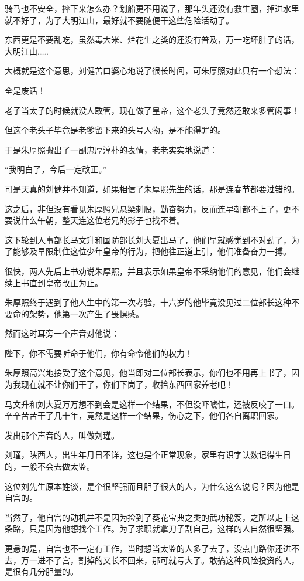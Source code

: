 \begin{multicols}{\theparacolNo}
骑马也不安全，摔下来怎么办？划船更不用说了，那年头还没有救生圈，掉进水里就不好了，为了大明江山，最好就不要随便干这些危险活动了。

东西更是不要乱吃，虽然毒大米、烂花生之类的还没有普及，万一吃坏肚子的话，大明江山……

大概就是这个意思，刘健苦口婆心地说了很长时间，可朱厚照对此只有一个想法：

全是废话！

老子当太子的时候就没人敢管，现在做了皇帝，这个老头子竟然还敢来多管闲事！

但这个老头子毕竟是老爹留下来的头号人物，是不能得罪的。

于是朱厚照搬出了一副忠厚淳朴的表情，老老实实地说道：

“我明白了，今后一定改正。”

可是天真的刘健并不知道，如果相信了朱厚照先生的话，那是连春节都要过错的。

这之后，非但没有看见朱厚照兄悬梁刺股，勤奋努力，反而连早朝都不上了，更不要说什么午朝，整天连这位老兄的影子也找不着。

这下轮到人事部长马文升和国防部长刘大夏出马了，他们早就感觉到不对劲了，为了能够及早限制住这位少年皇帝的行为，把他往正道上引，他们准备奋力一搏。

很快，两人先后上书劝说朱厚照，并且表示如果皇帝不采纳他们的意见，他们会继续上书直到皇帝改正为止。

朱厚照终于遇到了他人生中的第一次考验，十六岁的他毕竟没见过二位部长这种不要命的架势，他第一次产生了畏惧感。

然而这时耳旁一个声音对他说：

陛下，你不需要听命于他们，你有命令他们的权力！

朱厚照高兴地接受了这个意见，他当即对二位部长表示，你们也不用再上书了，因为我现在就不让你们干了，你们下岗了，收拾东西回家养老吧！

马文升和刘大夏万万想不到会是这样一个结果，不但没吓唬住，还被反咬了一口。辛辛苦苦干了几十年，竟然是这样一个结果，伤心之下，他们各自离职回家。

发出那个声音的人，叫做刘瑾。

刘瑾，陕西人，出生年月日不详，这也是个正常现象，家里有识字认数记得生日的，一般不会去做太监。

这位刘先生原本姓谈，是个很坚强而且胆子很大的人，为什么这么说呢？因为他是自宫的。

当然了，他自宫的动机并不是因为捡到了葵花宝典之类的武功秘笈，之所以走上这条路，只是因为他想找个工作。为了求职就拿刀子割自己，这样的人自然很坚强。

更悬的是，自宫也不一定有工作，当时想当太监的人多了去了，没点门路你还进不去，万一进不了宫，割掉的又长不回来，那可就亏大了。敢搞这种风险投资的人，是很有几分胆量的。


\end{multicols}
